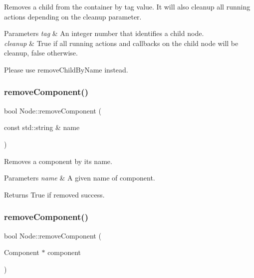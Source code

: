 Removes a child from the container by tag value. It will also cleanup all running actions depending on the cleanup parameter.


\begin{DoxyParams}{Parameters}
{\em tag} & An integer number that identifies a child node. \\
\hline
{\em cleanup} & True if all running actions and callbacks on the child node will be cleanup, false otherwise.\\
\hline
\end{DoxyParams}
Please use {\ttfamily remove\+Child\+By\+Name} instead. \mbox{\label{classNode_acce5160468bfd35be6804b8cf7a88142}} 
\subsubsection{\texorpdfstring{remove\+Component()}{removeComponent()}\hspace{0.1cm}{\footnotesize\ttfamily [1/4]}}
{\footnotesize\ttfamily bool Node\+::remove\+Component (\begin{DoxyParamCaption}\item[{const std\+::string \&}]{name }\end{DoxyParamCaption})\hspace{0.3cm}{\ttfamily [virtual]}}

Removes a component by its name.


\begin{DoxyParams}{Parameters}
{\em name} & A given name of component. \\
\hline
\end{DoxyParams}
\begin{DoxyReturn}{Returns}
True if removed success. 
\end{DoxyReturn}
\mbox{\label{classNode_a857bce3dc69f84d4746fbbb8ab2ea720}} 
\subsubsection{\texorpdfstring{remove\+Component()}{removeComponent()}\hspace{0.1cm}{\footnotesize\ttfamily [2/4]}}
{\footnotesize\ttfamily bool Node\+::remove\+Component (\begin{DoxyParamCaption}\item[{Component $\ast$}]{component }\end{DoxyParamCaption})\hspace{0.3cm}{\ttfamily [virtual]}}

